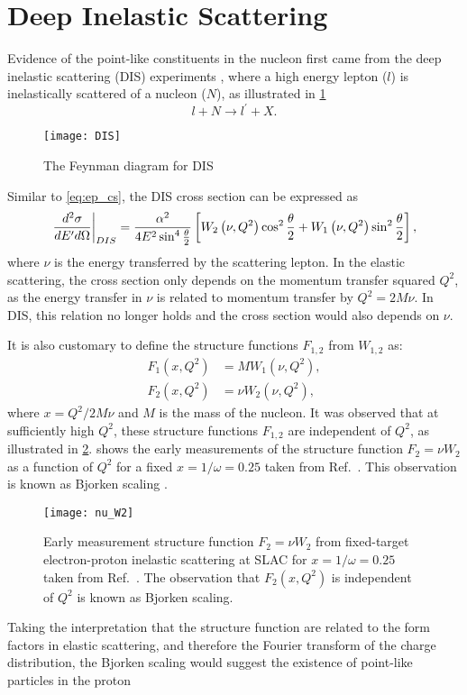 \documentclass[../main.tex]{subfiles}
\begin{document}
\section{Deep Inelastic Scattering}
\label{sec:dis}
Evidence of the point-like constituents in the nucleon first came from the deep
inelastic scattering (DIS) experiments \cite{breidenbach1969}, where a high
energy lepton ($l$) is inelastically scattered of a nucleon ($N$), as
illustrated in \cref{fig:DIS}
\begin{equation}
	l + N \rightarrow l^\prime + X.
\end{equation}
\begin{figure}[htbp!]
	\centering
	\texttt{[image: DIS]}
	\caption{The Feynman diagram for DIS}
	\label{fig:DIS}
\end{figure}
Similar to \cref{eq:ep_cs}, the DIS cross section can be expressed as
\begin{equation}
	\eval{\frac{d^2\sigma}{dE^\prime d\Omega}}_{DIS} = \frac{\alpha^2}{4E^2 \sin^4
		\frac{\theta}{2}} \left[ W_2\left(\nu,Q^2\right)\cos^2
		\frac{\theta}{2} + W_1\left(\nu,Q^2\right)\sin^2 \frac{\theta}{2}
		\right],
	\label{eq:DIS_cs1}
\end{equation}
where $\nu$ is the energy transferred by the scattering lepton.
In the elastic scattering, the cross section only depends on the momentum transfer squared $Q^2$,
as the energy transfer in $\nu$ is related to momentum transfer by $Q^2=2M\nu$.
In DIS, this relation no longer holds and the cross section would also depends on $\nu$.

It is also customary to define the structure functions $F_{1,2}$ from $W_{1,2}$ as:
\begin{equation}
	\begin{split}
		F_1\left(x,Q^2\right) &= MW_1\left(\nu,Q^2\right),\\
		F_2\left(x,Q^2\right) &= \nu W_2\left(\nu,Q^2\right),
	\end{split}
\end{equation}
where $x=Q^2/2M\nu$ and $M$ is the mass of the nucleon. It was observed that at sufficiently high $Q^2$,
these structure functions $F_{1,2}$ are independent of $Q^2$, as illustrated in
\cref{fig:w2}.  shows the early measurements of the
structure function $F_2=\nu W_2$ as a function of $Q^2$ for a fixed
$x=1/\omega=0.25$ taken from Ref.~\cite{friedman1972}. This observation is
known as Bjorken scaling \cite{bjorken1969}.
\begin{figure}[htpb!]
	\centering
	\texttt{[image: nu\_W2]}
	\caption{Early measurement structure function $F_2=\nu W_2$ from
		fixed-target electron-proton inelastic scattering at SLAC for
		$x=1/\omega=0.25$ taken from Ref.~\cite{friedman1972}. The observation
		that $F_2(x,Q^2)$ is independent of $Q^2$ is known as Bjorken scaling. }
	\label{fig:w2}
\end{figure}
Taking the interpretation that the structure function are related to the form factors in elastic scattering,
and therefore the Fourier transform of the charge distribution, the Bjorken scaling would suggest
the existence of point-like particles in the proton
\end{document}

